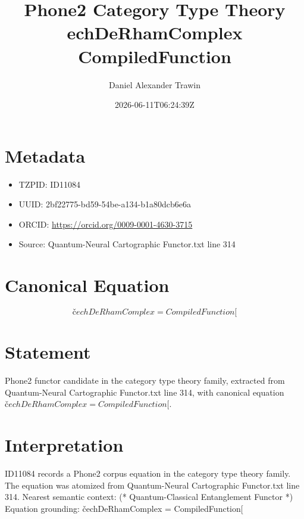 \documentclass[11pt]{article}
\title{Phone2 Category Type Theory echDeRhamComplex CompiledFunction}
\author{Daniel Alexander Trawin}
\date{2026-06-11T06:24:39Z}
\begin{document}
\maketitle
\section*{Metadata}
\begin{itemize}
\item TZPID: ID11084
\item UUID: 2bf22775-bd59-54be-a134-b1a80dcb6e6a
\item ORCID: \url{https://orcid.org/0009-0001-4630-3715}
\item Source: Quantum-Neural Cartographic Functor.txt line 314
\end{itemize}
\section*{Canonical Equation}
\[
čechDeRhamComplex = CompiledFunction[
\]
\section*{Statement}
Phone2 functor candidate in the category type theory family, extracted from Quantum-Neural Cartographic Functor.txt line 314, with canonical equation $čechDeRhamComplex = CompiledFunction[$.
\section*{Interpretation}
ID11084 records a Phone2 corpus equation in the category type theory family. The equation was atomized from Quantum-Neural Cartographic Functor.txt line 314. Nearest semantic context: (* Quantum-Classical Entanglement Functor *) Equation grounding: čechDeRhamComplex = CompiledFunction[
\end{document}
